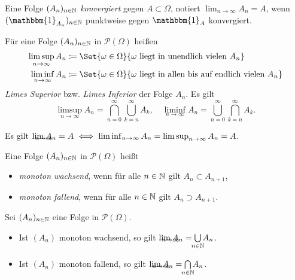 \documentclass{cheat-sheet}
\newcommand{\PS}{\mathcal{P}} %
\newcommand{\PSO}{\PS(\Omega)} %
\newcommand{\ind}{\mathbbm{1}} %
\theoremstyle{definition}
\begin{document}
\begin{defn}
  Eine Folge $(A_n)_{n \in \mathbb{N}}$ \emph{konvergiert} gegen $A \subset \Omega$, notiert $\lim_{n \to \infty} A_n = A$, wenn $(\ind_{A_n})_{n \in \N}$ punktweise gegen $\ind_A$ konvergiert.
\end{defn}

\begin{defn}
  Für eine Folge $(A_n)_{n \in \mathbb{N}}$ in $\PS(\Omega)$ heißen
  \begin{align*}
    \limsup_{n \to \infty} A_n &\coloneqq \Set{ \omega \in \Omega }{ \omega \text{ liegt in unendlich vielen } A_n } \\
    \liminf_{n \to \infty} A_n &\coloneqq \Set{ \omega \in \Omega }{ \omega \text{ liegt in allen bis auf endlich vielen } A_n }
  \end{align*}
  \emph{Limes Superior} bzw. \emph{Limes Inferior} der Folge $A_n$. Es gilt
  \[
    \limsup_{n \to \infty} A_n = \bigcap_{n = 0}^\infty \bigcup_{k = n}^\infty A_k, \quad
    \liminf_{n \to \infty} A_n = \bigcup_{n = 0}^\infty \bigcap_{k = n}^\infty A_k.
  \]
\end{defn}


\begin{satz}
  Es gilt $\lim_{\mathclap{n \to \infty}} A_n = A \iff \liminf_{n \to \infty} A_n = \limsup_{n \to \infty} A_n = A$.
\end{satz}

\begin{defn}
  Eine Folge $(A_n)_{n \in \mathbb{N}}$ in $\PSO$ heißt
  \begin{itemize}
    \item \emph{monoton wachsend}, wenn für alle $n \in \mathbb{N}$ gilt $A_n \subset A_{n+1}$,
    \item \emph{monoton fallend}, wenn für alle $n \in \mathbb{N}$ gilt $A_n \supset A_{n+1}$.
  \end{itemize}
\end{defn}

\begin{satz}
  Sei $(A_n)_{n \in \mathbb{N}}$ eine Folge in $\PSO$.
  \begin{itemize}
    \item Ist $(A_n)$ monoton wachsend, so gilt $\lim_{\mathclap{n \to \infty}} A_n = \bigcup_{\mathclap{n \in \N}} A_n$.
    \item Ist $(A_n)$ monoton fallend, so gilt $\lim_{\mathclap{n \to \infty}} A_n = \bigcap_{\mathclap{n \in \N}} A_n$.
  \end{itemize}
\end{satz}
\end{document}
